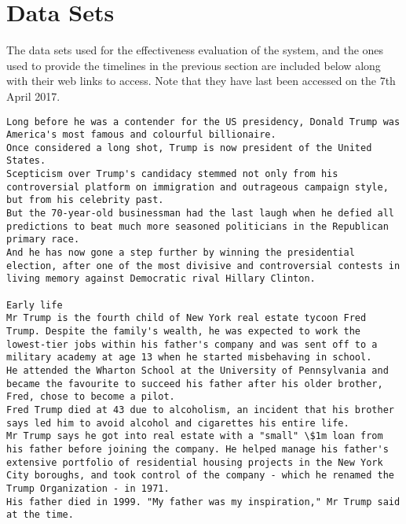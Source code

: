 \section{Data Sets}
\par The data sets used for the effectiveness evaluation of the system, and the ones used to provide the timelines in the previous section are included below along with their web links to access. Note that they have last been accessed on the 7th April 2017.

\begin{lstlisting}[numberstyle=\tiny\color{black},  keywordstyle=\color{black},  commentstyle=\color{black},  stringstyle=\color{black},caption={BBC: US elections 2016 results: Donald Trump's life story. Published on the 20th of January 2017. URL: http://www.bbc.com/news/world-us-canada-35318432}, captionpos=t]
Long before he was a contender for the US presidency, Donald Trump was America's most famous and colourful billionaire. 
Once considered a long shot, Trump is now president of the United States. 
Scepticism over Trump's candidacy stemmed not only from his controversial platform on immigration and outrageous campaign style, but from his celebrity past. 
But the 70-year-old businessman had the last laugh when he defied all predictions to beat much more seasoned politicians in the Republican primary race. 
And he has now gone a step further by winning the presidential election, after one of the most divisive and controversial contests in living memory against Democratic rival Hillary Clinton. 
 
Early life 
Mr Trump is the fourth child of New York real estate tycoon Fred Trump. Despite the family's wealth, he was expected to work the lowest-tier jobs within his father's company and was sent off to a military academy at age 13 when he started misbehaving in school. 
He attended the Wharton School at the University of Pennsylvania and became the favourite to succeed his father after his older brother, Fred, chose to become a pilot. 
Fred Trump died at 43 due to alcoholism, an incident that his brother says led him to avoid alcohol and cigarettes his entire life. 
Mr Trump says he got into real estate with a "small" \$1m loan from his father before joining the company. He helped manage his father's extensive portfolio of residential housing projects in the New York City boroughs, and took control of the company - which he renamed the Trump Organization - in 1971. 
His father died in 1999. "My father was my inspiration," Mr Trump said at the time. 
 

\end{lstlisting}
